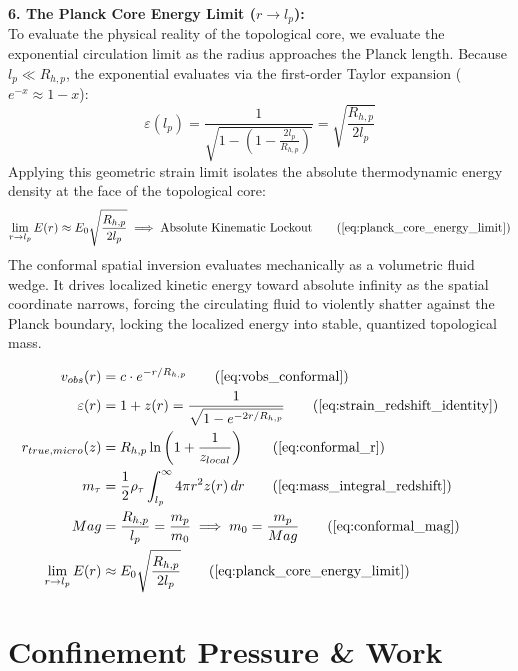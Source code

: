 \documentclass[11pt, a4paper]{article}
\begin{document}
\textbf{6. The Planck Core Energy Limit ($r \to l_p$):} \\
To evaluate the physical reality of the topological core, we evaluate the exponential circulation limit as the radius approaches the Planck length. Because $l_p \ll R_{h,p}$, the exponential evaluates via the first-order Taylor expansion ($e^{-x} \approx 1 - x$):
\begin{equation}
    \varepsilon(l_p) = \frac{1}{\sqrt{1 - (1 - \frac{2l_p}{R_{h,p}})}} = \sqrt{\frac{R_{h,p}}{2l_p}} 
\end{equation}
Applying this geometric strain limit isolates the absolute thermodynamic energy density at the face of the topological core:
\begin{equation}
    \lim_{r \to l_p} E(r) \approx E_0 \sqrt{\frac{R_{h,p}}{2l_p}} \implies \text{Absolute Kinematic Lockout} \tag{\ref{eq:planck_core_energy_limit}}
\end{equation}
The conformal spatial inversion evaluates mechanically as a volumetric fluid wedge. It drives localized kinetic energy toward absolute infinity as the spatial coordinate narrows, forcing the circulating fluid to violently shatter against the Planck boundary, locking the localized energy into stable, quantized topological mass.

\begin{tcolorbox}[recallbox, title={\ref{box:localized_metric_strain}. The Localized Metric (Conformal Duality)}]
\begin{align}
    v_{obs}(r) &= c \cdot e^{-r/R_{h,p}} \tag{\ref{eq:vobs_conformal}} \\
    \varepsilon(r) &= 1+z(r) = \frac{1}{\sqrt{1 - e^{-2r/R_{h,p}}}} \tag{\ref{eq:strain_redshift_identity}} \\
    r_{true, micro}(z) &= R_{h,p} \ln\left( 1 + \frac{1}{z_{local}} \right) \tag{\ref{eq:conformal_r}} \\
    m_\tau &= \frac{1}{2} \rho_{\tau} \int_{l_p}^\infty 4\pi r^2 z(r) \, dr \tag{\ref{eq:mass_integral_redshift}} \\
    Mag &= \frac{R_{h,p}}{l_p} = \frac{m_p}{m_0} \implies m_0 = \frac{m_p}{Mag} \tag{\ref{eq:conformal_mag}} \\
    \lim_{r \to l_p} E(r) &\approx E_0 \sqrt{\frac{R_{h,p}}{2l_p}} \tag{\ref{eq:planck_core_energy_limit}}
\end{align}
\end{tcolorbox}


\section{Confinement Pressure \& Work}
\label{sec:deriv_bag_pressure}
\end{document}
